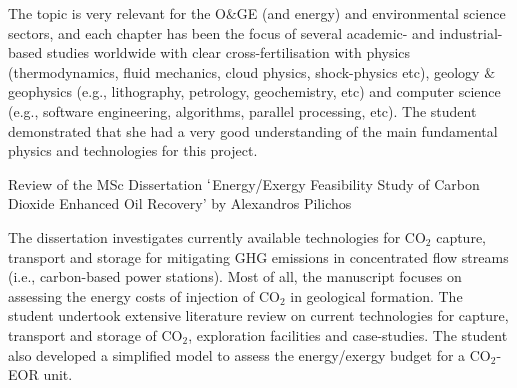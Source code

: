 \documentclass[14pt,twoside]{report}
\begin{document}
The topic is very relevant for the O$\&$GE (and energy) and environmental science sectors, and each chapter has been the focus of several academic- and industrial-based studies worldwide with clear cross-fertilisation with physics (thermodynamics, fluid mechanics, cloud physics, shock-physics etc), geology $\&$ geophysics (e.g., lithography, petrology, geochemistry, etc) and computer science (e.g., software engineering, algorithms, parallel processing, etc). The student demonstrated that she had a very good understanding of the main fundamental physics and technologies for this project.


\clearpage



\bigskip

\begin{center}
{\Large Review of the MSc Dissertation $\lq$Energy/Exergy Feasibility Study of Carbon Dioxide Enhanced Oil Recovery' by Alexandros Pilichos}
\end{center}

\medskip

The dissertation investigates currently available technologies for CO$_{2}$ capture, transport and storage for mitigating GHG emissions in concentrated flow streams (i.e., carbon-based power stations). Most of all, the manuscript focuses on assessing the energy costs of injection of CO$_{2}$ in geological formation. The student undertook extensive literature review on current technologies for capture, transport and storage of CO$_{2}$, exploration facilities and case-studies. The student also developed a simplified model to assess the energy/exergy budget for a CO$_{2}$-EOR unit.
\end{document}
